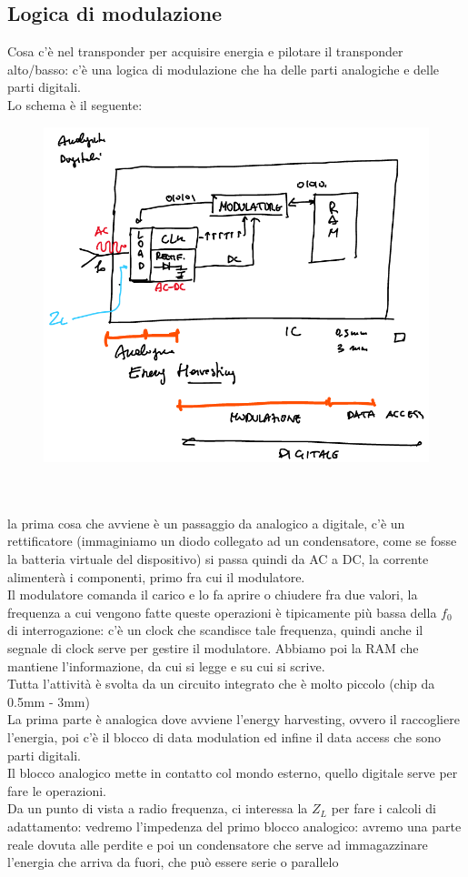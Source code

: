 \documentclass[oneside, 12pt]{extbook}
\begin{document}
\subsection{Logica di modulazione}
Cosa c'è nel transponder per acquisire energia e pilotare il transponder alto/basso: c'è una logica di modulazione che ha delle parti analogiche e delle parti digitali.\\Lo schema è il seguente:\\
\begin{figure}[!h]
	\includegraphics[scale=0.3]{immagini/log_mod.png}
\end{figure}\\\\
la prima cosa che avviene è un passaggio da analogico a digitale, c'è un rettificatore (immaginiamo un diodo collegato ad un condensatore, come se fosse la batteria virtuale del dispositivo) si passa quindi da AC a DC, la corrente alimenterà i componenti, primo fra cui il modulatore.\\Il modulatore comanda il carico e lo fa aprire o chiudere fra due valori, la frequenza a cui vengono fatte queste operazioni è tipicamente più bassa della $f_0$ di interrogazione: c'è un clock che scandisce tale frequenza, quindi anche il segnale di clock serve per gestire il modulatore. Abbiamo poi la RAM che mantiene l'informazione, da cui si legge e su cui si scrive.\\Tutta l'attività è svolta da un circuito integrato che è molto piccolo (chip da 0.5mm - 3mm)\\La prima parte è analogica dove avviene l'energy harvesting, ovvero il raccogliere l'energia, poi c'è il blocco di data modulation ed infine il data access che sono parti digitali.\\Il blocco analogico mette in contatto col mondo esterno, quello digitale serve per fare le operazioni.\\Da un punto di vista a radio frequenza, ci interessa la $Z_L$ per fare i calcoli di adattamento: vedremo l'impedenza del primo blocco analogico: avremo una parte reale dovuta alle perdite e poi un condensatore che serve ad immagazzinare l'energia che arriva da fuori, che può essere serie o parallelo\\
\end{document}
